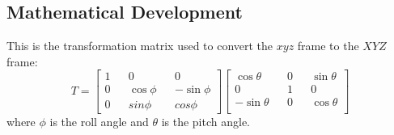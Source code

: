 \documentclass[12pt,twoside,letterpaper]{article}
\begin{document}
\subsection{Mathematical Development} \label{mathematicalDev}
This is the transformation matrix used to convert the $xyz$ frame to the $XYZ$ frame: 
\begin{equation}
T = 
\begin{bmatrix}
1 && 0 && 0 \\ 
0 && \cos{\phi} && -\sin{\phi} \\
0 && sin{\phi} && cos{\phi}
\end{bmatrix}
\begin{bmatrix}
\cos{\theta} && 0 && \sin{\theta} \\ 
0 && 1 && 0 \\
-\sin{\theta} && 0 && \cos{\theta}\\
\end{bmatrix}
\end{equation}
where $\phi$ is the roll angle and $\theta$ is the pitch angle. 
\end{document}
